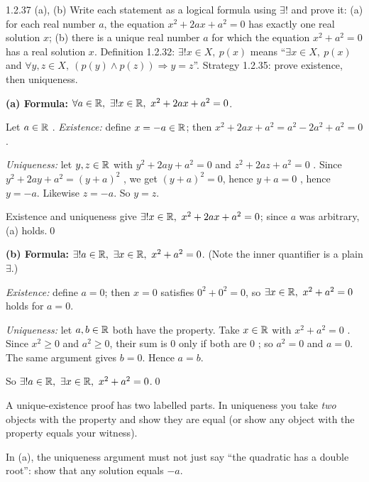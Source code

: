 \begin{bookex}[recommended]{1.2.37 (a), (b)}
Write each statement as a logical formula using $\exists!$ and prove it: (a) for each real number $a$, the equation $x^2+2ax+a^2=0$ has exactly one real solution $x$; (b) there is a unique real number $a$ for which the equation $x^2+a^2=0$ has a real solution $x$.
\solution
\given Definition 1.2.32: $\exists!x\in X,\ p(x)$ means ``$\exists x\in X,\ p(x)$ and $\forall y,z\in X,\ (p(y)\wedge p(z))\Rightarrow y=z$''. Strategy 1.2.35: prove existence, then uniqueness.
\begin{steps}
\item \textbf{(a) Formula:} $\forall a\in\mathbb{R},\ \exists!x\in\mathbb{R},\ x^2+2ax+a^2=0$.
\item Let $a\in\mathbb{R}$ . \emph{Existence:} define $x=-a\in\mathbb{R}$; then $x^2+2ax+a^2=a^2-2a^2+a^2=0$ .
\item \emph{Uniqueness:} let $y,z\in\mathbb{R}$ with $y^2+2ay+a^2=0$ and $z^2+2az+a^2=0$ . Since $y^2+2ay+a^2=(y+a)^2$ , we get $(y+a)^2=0$, hence $y+a=0$ , hence $y=-a$. Likewise $z=-a$. So $y=z$.
\item Existence and uniqueness give $\exists!x\in\mathbb{R},\ x^2+2ax+a^2=0$; since $a$ was arbitrary, (a) holds.\qed
\item \textbf{(b) Formula:} $\exists!a\in\R,\ \exists x\in\R,\ x^2+a^2=0$. (Note the inner quantifier is a plain $\exists$.)
\item \emph{Existence:} define $a=0$; then $x=0$ satisfies $0^2+0^2=0$, so $\exists x\in\mathbb{R},\ x^2+a^2=0$ holds for $a=0$.
\item \emph{Uniqueness:} let $a,b\in\mathbb{R}$ both have the property. Take $x\in\mathbb{R}$ with $x^2+a^2=0$ . Since $x^2\ge0$ and $a^2\ge0$, their sum is $0$ only if both are $0$ ; so $a^2=0$ and $a=0$. The same argument gives $b=0$. Hence $a=b$.
\item So $\exists!a\in\R,\ \exists x\in\R,\ x^2+a^2=0$.\qed
\end{steps}
\begin{compare}
\item A unique-existence proof has two labelled parts. In uniqueness you take \emph{two} objects with the property and show they are equal (or show any object with the property equals your witness).
\item In (a), the uniqueness argument must not just say ``the quadratic has a double root'': show that any solution equals $-a$.
\end{compare}
\end{bookex}

